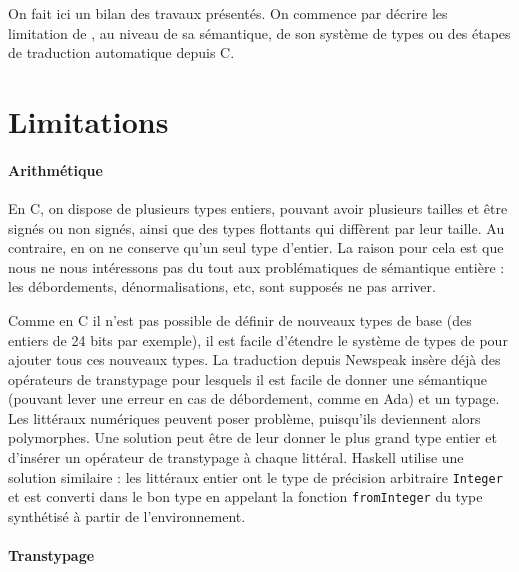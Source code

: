On fait ici un bilan des travaux présentés. On commence par décrire les
limitation de \langname, au niveau de sa sémantique, de son système de types ou
des étapes de traduction automatique depuis C.



\section{Limitations}

\paragraph{Arithmétique}

En C, on dispose de plusieurs types entiers, pouvant avoir plusieurs tailles et
être signés ou non signés, ainsi que des types flottants qui diffèrent par leur
taille. Au contraire, en \langname on ne conserve qu'un seul type d'entier. La
raison pour cela est que nous ne nous intéressons pas du tout aux problématiques
de sémantique entière : les débordements, dénormalisations, etc, sont supposés
ne pas arriver.

Comme en C il n'est pas possible de définir de nouveaux types de base (des
entiers de 24 bits par exemple), il est facile d'étendre le système de types de
\langname pour ajouter tous ces nouveaux types. La traduction depuis Newspeak
insère déjà des opérateurs de transtypage pour lesquels il est facile de donner
une sémantique (pouvant lever une erreur en cas de débordement, comme en Ada) et
un typage. Les littéraux numériques peuvent poser problème, puisqu'ils
deviennent alors polymorphes. Une solution peut être de leur donner le plus
grand type entier et d'insérer un opérateur de transtypage à chaque littéral.
Haskell utilise une solution similaire : les littéraux entier ont le type de
précision arbitraire \texttt{Integer} et est converti dans le bon type en
appelant la fonction \texttt{fromInteger} du type synthétisé à partir de
l'environnement.

\paragraph{Transtypage}

